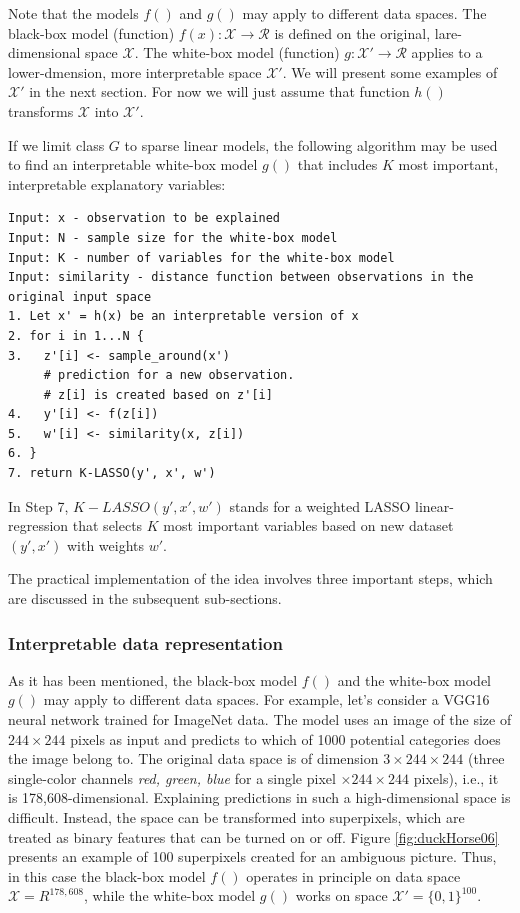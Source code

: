 \documentclass[12pt,]{krantz}
\begin{document}
Note that the models \(f()\) and \(g()\) may apply to different data spaces. The black-box model (function) \(f(x):\mathcal X \rightarrow \mathcal R\) is defined on the original, lare-dimensional space \(\mathcal X\). The white-box model (function) \(g:\mathcal X' \rightarrow \mathcal R\) applies to a lower-dmension, more interpretable space \(\mathcal X'\). We will present some examples of \(\mathcal X'\) in the next section. For now we will just assume that function \(h()\) transforms \(\mathcal X\) into \(\mathcal X'\).

If we limit class \(G\) to sparse linear models, the following algorithm may be used to find an interpretable white-box model \(g()\) that includes \(K\) most important, interpretable explanatory variables:

\begin{verbatim}
Input: x - observation to be explained
Input: N - sample size for the white-box model 
Input: K - number of variables for the white-box model
Input: similarity - distance function between observations in the original input space
1. Let x' = h(x) be an interpretable version of x 
2. for i in 1...N {
3.   z'[i] <- sample_around(x') 
     # prediction for a new observation. 
     # z[i] is created based on z'[i] 
4.   y'[i] <- f(z[i]) 
5.   w'[i] <- similarity(x, z[i]) 
6. }
7. return K-LASSO(y', x', w')
\end{verbatim}

In Step 7, \(K-LASSO(y', x', w')\) stands for a weighted LASSO linear-regression that selects \(K\) most important variables based on new dataset \((y', x')\) with weights \(w'\).

The practical implementation of the idea involves three important steps, which are discussed in the subsequent sub-sections.

\hypertarget{interpretable-data-representation}{%
\subsubsection{Interpretable data representation}\label{interpretable-data-representation}}

As it has been mentioned, the black-box model \(f()\) and the white-box model \(g()\) may apply to different data spaces. For example, let's consider a VGG16 neural network \citep{Simonyan15} trained for ImageNet data. The model uses an image of the size of \(244 \times 244\) pixels as input and predicts to which of 1000 potential categories does the image belong to. The original data space is of dimension \(3 \times 244 \times 244\) (three single-color channels \emph{red, green, blue} for a single pixel \(\times 244 \times 244\) pixels), i.e., it is 178,608-dimensional. Explaining predictions in such a high-dimensional space is difficult. Instead, the space can be transformed into superpixels, which are treated as binary features that can be turned on or off. Figure \ref{fig:duckHorse06} presents an example of 100 superpixels created for an ambiguous picture. Thus, in this case the black-box model \(f()\) operates in principle on data space \(\mathcal X=R^{178,608}\), while the white-box model \(g()\) works on space \(\mathcal X' = \{0,1\}^{100}\).
\end{document}
